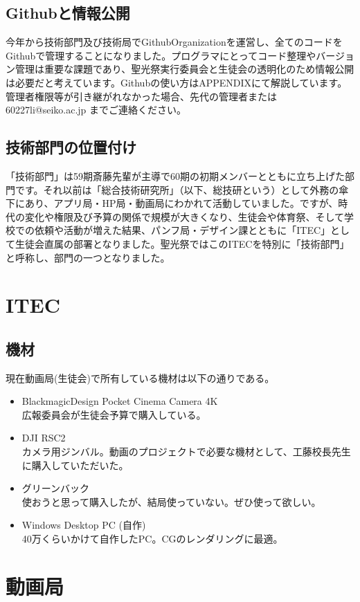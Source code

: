 \documentclass[dvipdfmx,11pt]{jarticle}
\begin{document}
\subsection{Githubと情報公開}
今年から技術部門及び技術局でGithubOrganizationを運営し、全てのコードをGithubで管理することになりました。プログラマにとってコード整理やバージョン管理は重要な課題であり、聖光祭実行委員会と生徒会の透明化のため情報公開は必要だと考えています。Githubの使い方はAPPENDIXにて解説しています。管理者権限等が引き継がれなかった場合、先代の管理者または 60227li@seiko.ac.jp までご連絡ください。
\subsection{技術部門の位置付け}
「技術部門」は59期斎藤先輩が主導で60期の初期メンバーとともに立ち上げた部門です。それ以前は「総合技術研究所」（以下、総技研という）として外務の傘下にあり、アプリ局・HP局・動画局にわかれて活動していました。ですが、時代の変化や権限及び予算の関係で規模が大きくなり、生徒会や体育祭、そして学校での依頼や活動が増えた結果、パンフ局・デザイン課とともに「ITEC」として生徒会直属の部署となりました。聖光祭ではこのITECを特別に「技術部門」と呼称し、部門の一つとなりました。
\section{ITEC}
 \subsection{機材}
 現在動画局(生徒会)で所有している機材は以下の通りである。
 \begin{itemize}
  \item BlackmagicDesign Pocket Cinema Camera 4K\\
  広報委員会が生徒会予算で購入している。
  \item DJI RSC2\\
  カメラ用ジンバル。動画のプロジェクトで必要な機材として、工藤校長先生に購入していただいた。
  \item グリーンバック\\
  使おうと思って購入したが、結局使っていない。ぜひ使って欲しい。
  \item Windows Desktop PC (自作)\\
 40万くらいかけて自作したPC。CGのレンダリングに最適。
 \end{itemize}
\section{動画局}
\end{document}
